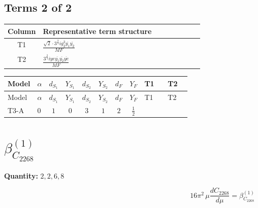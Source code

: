 \documentclass[8pt]{article}
\begin{document}
\begin{landscape}
\subsection*{Terms 2 of 2}
\begin{center}
\begin{tabular}{@{}c >{\raggedright\arraybackslash}p{0.82\linewidth}@{}}
\toprule
Column & Representative term structure \\
\midrule
T1 & \(\displaystyle \frac{\sqrt{2} \cdot 3^{\frac{3}{4}} i g_{2}^{2} \overline{y_{1}} \overline{y_{2}}}{MF}\) \\
\midrule
T2 & \(\displaystyle \frac{3^{\frac{3}{4}} i ye \overline{y_{1}} \overline{y_{2}} \overline{ye}}{MF}\) \\
\midrule
\bottomrule
\end{tabular}
\end{center}
\smallskip
\tiny
\begin{longtable}{@{}llcccccc >{\raggedright\arraybackslash}p{0.21\linewidth} >{\raggedright\arraybackslash}p{0.21\linewidth}@{}}
\toprule
Model & $\alpha$ & $d_{S_1}$ & $Y_{S_1}$ & $d_{S_2}$ & $Y_{S_2}$ & $d_F$ & $Y_F$ & T1 & T2 \\
\midrule
\endfirsthead
\toprule
Model & $\alpha$ & $d_{S_1}$ & $Y_{S_1}$ & $d_{S_2}$ & $Y_{S_2}$ & $d_F$ & $Y_F$ & T1 & T2 \\
\midrule
\endhead
T3-A & $0$ & $1$ & $0$ & $3$ & $1$ & $2$ & $\frac{1}{2}$ & \scriptsize\adjustbox{max width=\linewidth}{$\begin{gathered} - \frac{\sqrt{2} \cdot 3^{\frac{3}{4}} i g_{2}^{2} \overline{y_{1}} \overline{y_{2}}}{3 MF}\end{gathered}$} & \scriptsize\adjustbox{max width=\linewidth}{$\begin{gathered} \frac{3^{\frac{3}{4}} i ye \overline{y_{1}} \overline{y_{2}} \overline{ye}}{12 MF}\end{gathered}$} \\
\midrule
\bottomrule
\end{longtable}
\clearpage
\section*{$\beta_{C_{2268}}^{(1)}$}
\noindent\textbf{Quantity: }$\mathrm{2,2,6,8}$\par\smallskip
\[16\pi^2\,\mu\frac{d C_{2268}}{d\mu}=\beta_{C_{2268}}^{(1)}\]

\end{landscape}
\end{document}
